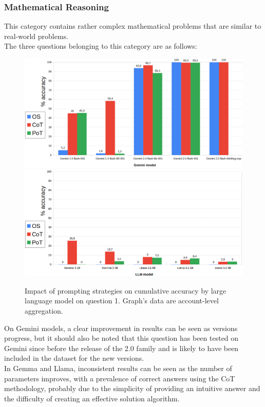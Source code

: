 \documentclass[12pt]{article}
\begin{document}
\subsubsection{Mathematical Reasoning} %
This category contains rather complex mathematical problems that are similar to real-world problems.\\ 
The three questions belonging to this category are as follows:\\


    \begin{figure}[H]
    \centering
            \includegraphics[width=1\textwidth]{q101Gemini.png}
            \includegraphics[width=1\textwidth]{q101Other.png}
    \caption[Accuracy on Question 1 by LLM]{Impact of prompting strategies on cumulative accuracy by large language model on question 1. Graph's data are account-level aggregation.}
    \end{figure} 
On Gemini models, a clear improvement in results can be seen as versions progress, but it should also be noted that this question has been tested on Gemini since before the release of the 2.0 family and is likely to have been included in the dataset for the new versions.\\
In Gemma and Llama, inconsistent results can be seen as the number of parameters improves, with a prevalence of correct answers using the CoT methodology, probably due to the simplicity of providing an intuitive answer and the difficulty of creating an effective solution algorithm.\\
\end{document}
